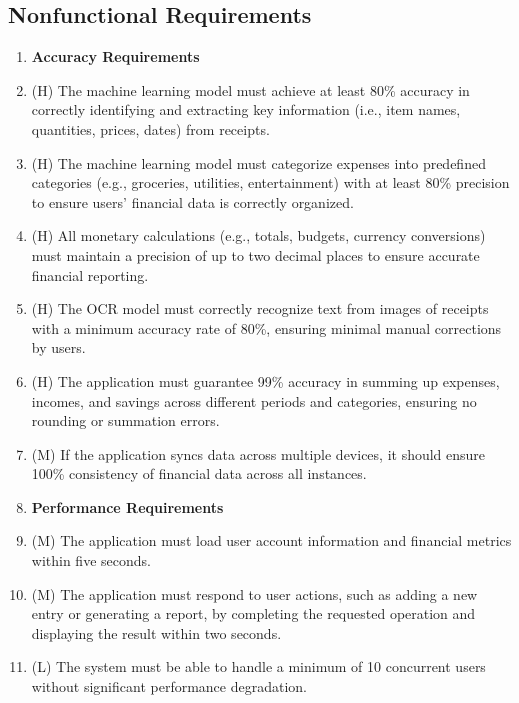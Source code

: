 \documentclass[12pt]{article}
\begin{document}
\subsection{Nonfunctional Requirements}
\begin{enumerate}[label=NFR\arabic*]
  \item[] \textbf{Accuracy Requirements}
  \item (H) The machine learning model must achieve at least 80\% accuracy in
  correctly identifying and extracting key information (i.e., item names,
  quantities, prices, dates) from receipts.
  \item (H) The machine learning model must categorize expenses into predefined
  categories (e.g., groceries, utilities, entertainment) with at least 80\%
  precision to ensure users' financial data is correctly organized.
  \item (H) All monetary calculations (e.g., totals, budgets, currency
  conversions) must maintain a precision of up to two decimal places to ensure
  accurate financial reporting.
  \item (H) The OCR model must correctly recognize text from images of receipts
  with a minimum accuracy rate of 80\%, ensuring minimal manual corrections by
  users.
  \item (H) The application must guarantee 99\% accuracy in summing up expenses,
  incomes, and savings across different periods and categories, ensuring no
  rounding or summation errors.
  \item (M) If the application syncs data across multiple devices, it should
  ensure 100\% consistency of financial data across all instances.

  \item[]\textbf{Performance Requirements}
  \item (M) The application must load user account information and financial metrics within five seconds.
  \item (M) The application must respond to user actions, such as adding a new entry or generating a report, by completing 
  the requested operation and displaying the result within two seconds.
  \item (L) The system must be able to handle a minimum of 10 concurrent users without significant performance degradation.


\end{enumerate}
\end{document}
